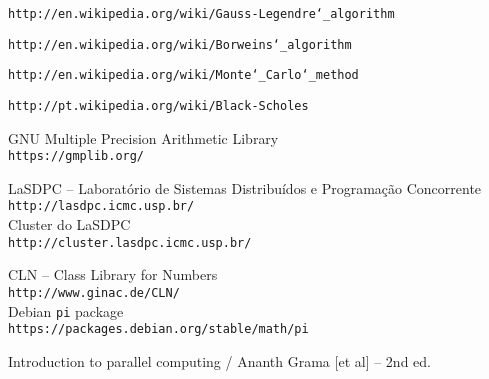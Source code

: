 \newpage

\begin{thebibliography}{9}

		\texttt{http://en.wikipedia.org/wiki/Gauss-Legendre\char`_algorithm}

		\texttt{http://en.wikipedia.org/wiki/Borwein{\textquotesingle}s\char`_algorithm}

		\texttt{http://en.wikipedia.org/wiki/Monte\char`_Carlo\char`_method}
	
		\texttt{http://pt.wikipedia.org/wiki/Black-Scholes}

		GNU Multiple Precision Arithmetic Library\\
		\texttt{https://gmplib.org/}

		LaSDPC -- Laboratório de Sistemas Distribuídos e Programação Concorrente\\
		\texttt{http://lasdpc.icmc.usp.br/}\\
		Cluster do LaSDPC\\
		\texttt{http://cluster.lasdpc.icmc.usp.br/}

		CLN -- Class Library for Numbers\\
		\texttt{http://www.ginac.de/CLN/}\\
		Debian \texttt{pi} package\\
		\texttt{https://packages.debian.org/stable/math/pi}

		Introduction to parallel computing / Ananth Grama [et al] -- 2nd ed.

\end{thebibliography}
